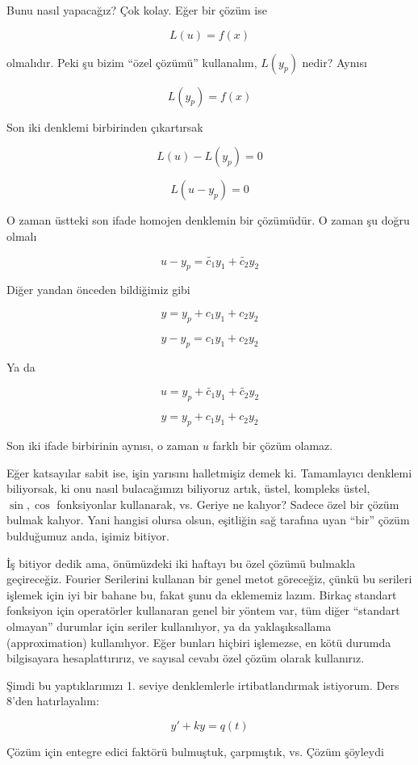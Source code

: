 \documentclass[12pt,fleqn]{article}\usepackage{../../common}
\begin{document}
Bunu nasıl yapacağız? Çok kolay. Eğer bir çözüm ise 

$$ L(u) = f(x) $$

olmalıdır. Peki şu bizim ``özel çözümü'' kullanalım, $L(y_p)$ nedir? Aynısı

$$ L(y_p) = f(x) $$

Son iki denklemi birbirinden çıkartırsak

$$ L(u) - L(y_p) = 0 $$

$$ L(u - y_p) = 0$$

O zaman üstteki son ifade homojen denklemin bir çözümüdür. O zaman şu doğru
olmalı

$$ u-y_p =  \tilde{c_1}y_1 + \tilde{c_2}y_2 $$

Diğer yandan önceden bildiğimiz gibi

$$ y = y_p + c_1y_1 + c_2y_2 $$

$$ y -  y_p = c_1y_1 + c_2y_2 $$

Ya da 

$$ u = y_p + \tilde{c_1}y_1 + \tilde{c_2}y_2 $$

$$ y = y_p + c_1y_1 + c_2y_2 $$

Son iki ifade birbirinin aynısı, o zaman $u$ farklı bir çözüm olamaz. 

Eğer katsayılar sabit ise, işin yarısını halletmişiz demek ki. Tamamlayıcı
denklemi biliyorsak, ki onu nasıl bulacağımızı biliyoruz artık, üstel, kompleks
üstel, $\sin, \cos$ fonksiyonlar kullanarak, vs. Geriye ne kalıyor?  Sadece özel
bir çözüm bulmak kalıyor. Yani hangisi olursa olsun, eşitliğin sağ tarafına uyan
``bir'' çözüm bulduğumuz anda, işimiz bitiyor.

İş bitiyor dedik ama, önümüzdeki iki haftayı bu özel çözümü bulmakla
geçireceğiz. Fourier Serilerini kullanan bir genel metot göreceğiz, çünkü bu
serileri işlemek için iyi bir bahane bu, fakat şunu da eklememiz lazım. Birkaç
standart fonksiyon için operatörler kullanaran genel bir yöntem var, tüm diğer
``standart olmayan'' durumlar için seriler kullanılıyor, ya da yaklaşıksallama
(approximation) kullanılıyor. Eğer bunları hiçbiri işlemezse, en kötü durumda
bilgisayara hesaplattırırız, ve sayısal cevabı özel çözüm olarak kullanırız.

Şimdi bu yaptıklarımızı 1. seviye denklemlerle irtibatlandırmak
istiyorum. Ders 8'den hatırlayalım:

$$ y' + ky = q(t) $$

Çözüm için entegre edici faktörü bulmuştuk, çarpmıştık, vs. Çözüm şöyleydi
\end{document}

